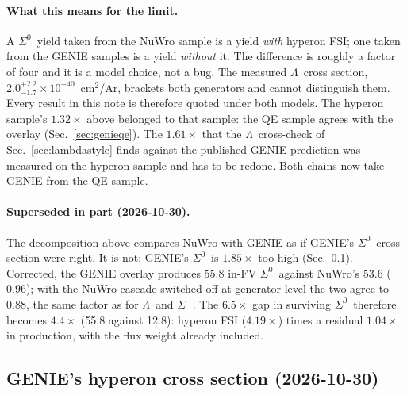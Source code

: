 \documentclass[11pt,a4paper]{article}
\newcommand{\Szero}{\ensuremath{\Sigma^{0}}}
\newcommand{\Lam}{\ensuremath{\Lambda}}
\begin{document}
\paragraph{What this means for the limit.} A \Szero\ yield taken from the NuWro
sample is a yield \emph{with} hyperon FSI; one taken from the GENIE samples is a
yield \emph{without} it. The difference is roughly a factor of four and it is a model
choice, not a bug. The measured \Lam\ cross section,
$2.0^{+2.2}_{-1.7}\times10^{-40}$~cm$^2$/Ar, brackets both generators and cannot
distinguish them. Every result in this note is therefore quoted under both models.
The hyperon sample's $1.32\times$ above belonged to that sample: the QE sample agrees
with the overlay (Sec.~\ref{sec:genieqe}). The $1.61\times$ that the \Lam\ cross-check
of Sec.~\ref{sec:lambdastyle} finds against the published GENIE prediction was
measured on the hyperon sample and has to be redone. Both chains now take GENIE from
the QE sample.

\paragraph{Superseded in part (2026-10-30).} The decomposition above compares NuWro
with GENIE as if GENIE's \Szero\ cross section were right. It is not: GENIE's \Szero\ is
$1.85\times$ too high (Sec.~\ref{sec:pais}). Corrected, the GENIE overlay produces 55.8 in-FV
\Szero\ against NuWro's 53.6 ($0.96$); with the NuWro cascade switched off at generator
level the two agree to $0.88$, the same factor as for \Lam\ and $\Sigma^-$. The $6.5\times$
gap in surviving \Szero\ therefore becomes $4.4\times$ (55.8 against 12.8): hyperon FSI
($4.19\times$) times a residual $1.04\times$ in production, with the flux weight already
included.

\subsection{GENIE's hyperon cross section (2026-10-30)}
\label{sec:pais}
\end{document}
